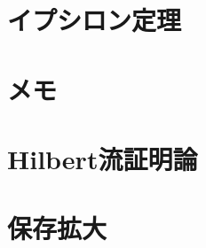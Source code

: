 \documentclass[a4j,10.5pt,oneside,openany]{jsbook}
\theoremstyle{mystyle}
\begin{document}
\chapter{イプシロン定理}
	
	
	

\chapter{メモ}
	
	
	

\chapter{Hilbert流証明論}
	

\chapter{保存拡大}
	
	
	
	

\printindex
\end{document}
